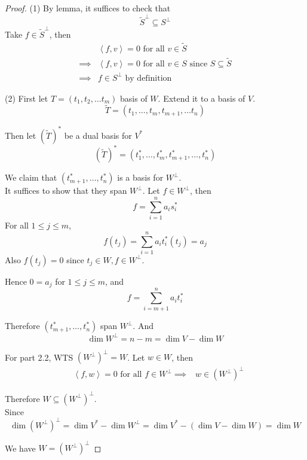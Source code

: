\begin{proof}

    (1) By lemma, it suffices to check that 
    \[
        \tilde{S}^{\perp} \subseteq S^{\perp}
    \]
    Take $f \in \tilde{S}^{\perp}$, then 
    \begin{align*}
        &\left< f, v\right> = 0 \text{ for all } v \in \tilde{S} \\
        \implies & \left<f, v \right> = 0 \text{ for all } v \in S \text{ since } S \subseteq \tilde{S} \\
        \implies & f \in S^{\perp} \text{ by definition}
    \end{align*}

    (2) First let $T = (t_1, t_2, \hdots t_m)$ basis of $W$. Extend it to a basis of $V$. 
    \[ 
    \tilde{T} = (t_1, \hdots, t_m, t_{m + 1}, \hdots t_n)
    \]

    Then let $ \left( \tilde{T} \right)^*$ be a dual basis for $V^*$
    \[
    \left( \tilde{T} \right)^* = (t_1^*, \hdots, t_m^*, t_{m + 1}^*, \hdots, t_n^*)
    \]

    We claim that $ \left( t_{m + 1}^*, \hdots, t_n^* \right) $ is a basis for $W^{\perp}$. \\

    It suffices to show that they span $W^{\perp}$. Let $f \in W^{\perp}$, then 
    \[
        f = \sum\limits_{ i = 1}^{n}  a_i s_i^* 
    \]
    For all $1 \leq j \leq m$, 
    \[
        f(t_j) = \sum\limits_{i = 1}^{n}  a_i t_i^* (t_j) = a_j
    \]
    Also $f(t_j) = 0$ since $t_j \in W, f \in W^{\perp}$. 

    Hence $0 = a_j$ for $1 \leq j \leq m$, and 
    \[f =\sum\limits_{i = m + 1}^{n}  a_i t_i^*
    \]

    Therefore $(t_{m + 1}^*, \hdots, t_n^*)$ span $W^{\perp}$. And 
    \[\dim W^{\perp} = n - m = \dim V - \dim W
    \]

    For part 2.2, WTS $\left(W^{\perp}\right)^{\perp} = W$. Let $w \in W$, then 
    \begin{align*}
        & \left< f, w \right> = 0 \text{ for all } f \in W^{\perp} 
        \implies & w \in \left( W^{\perp} \right)^{\perp}
    \end{align*}

    Therefore $W \subseteq \left( W^{\perp} \right)^{\perp}$. \\

    Since 
    \[
        \dim \left( W^{\perp} \right)^{\perp} = \dim V^* - \dim W^{\perp} = \dim V^* - (\dim V - \dim W) = \dim W
    \]

    We have $W = (W^{\perp})^{\perp}$
\end{proof}

\newpage









